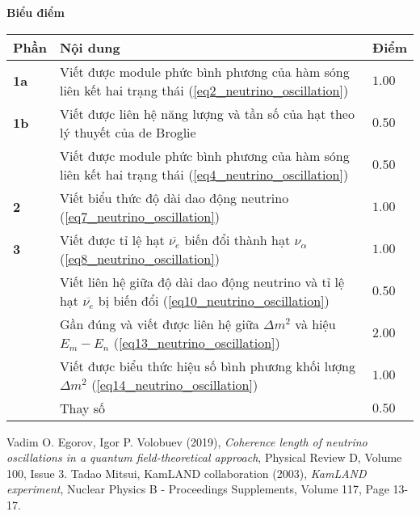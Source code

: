 \textbf{Biểu điểm}
\begin{center}
\begin{tabular}{|>{\centering\arraybackslash}m{1cm}|>{\raggedright\arraybackslash}m{14cm}| >{\centering\arraybackslash}m{1cm}|}
    \hline
    \textbf{Phần} & \textbf{Nội dung} & \textbf{Điểm} \\
    \hline
    \textbf{1a} & Viết được module phức bình phương của hàm sóng liên kết hai trạng thái (\ref{eq2_neutrino_oscillation}) & $1.00$ \\
    \hline 
    \textbf{1b} & Viết được liên hệ năng lượng và tần số của hạt theo lý thuyết của de Broglie & $0.50$ \\
    \cline{2-3}
    &  Viết được module phức bình phương của hàm sóng liên kết hai trạng thái (\ref{eq4_neutrino_oscillation}) & $0.50$ \\
    \hline 
    \textbf{2} & Viết biểu thức độ dài dao động neutrino (\ref{eq7_neutrino_oscillation}) & $1.00$ \\
    \hline 
    \textbf{3} & Viết được tỉ lệ hạt $\overline{\nu_e}$ biến đổi thành hạt $\nu_{\alpha}$ (\ref{eq8_neutrino_oscillation}) & $1.00$ \\
    \cline{2-3}
    &  Viết liên hệ giữa độ dài dao động neutrino và tỉ lệ hạt $\overline{\nu_e}$ bị biến đổi (\ref{eq10_neutrino_oscillation}) & $0.50$ \\
    \cline{2-3}
    &  Gần đúng và viết được liên hệ giữa $\Delta m^2$ và hiệu $E_m-E_n$ (\ref{eq13_neutrino_oscillation}) & $2.00$ \\
    \cline{2-3}
    &  Viết được biểu thức hiệu số bình phương khối lượng $\Delta m^2$ (\ref{eq14_neutrino_oscillation}) & $1.00$ \\
    \cline{2-3}
    &  Thay số & $0.50$ \\
    \hline
\end{tabular}
\end{center}


\begin{thebibliography}{}
 Vadim O. Egorov, Igor P. Volobuev (2019), \textit{Coherence length of neutrino oscillations in a quantum field-theoretical approach}, Physical Review D, Volume 100, Issue 3.
 Tadao Mitsui, KamLAND collaboration (2003), \textit{KamLAND experiment}, Nuclear Physics B - Proceedings Supplements, Volume 117, Page 13-17.
\end{thebibliography}